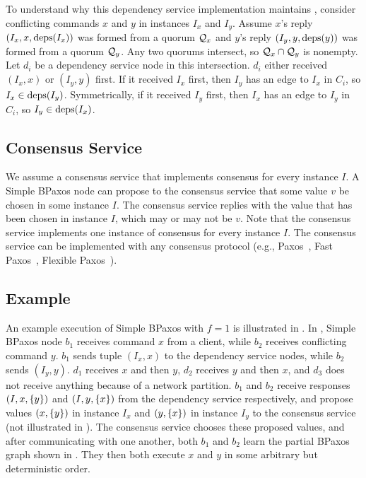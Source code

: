 To understand why this dependency service implementation maintains
, consider conflicting commands $x$ and $y$ in
instances $I_x$ and $I_y$. Assume $x$'s reply $(I_x, x, \text{deps}(I_x))$ was formed
from a quorum $\mathcal{Q}_x$ and $y$'s reply $(I_y, y, \text{deps}(y))$ was formed from
a quorum $\mathcal{Q}_y$. Any two quorums intersect, so $\mathcal{Q}_x \cap \mathcal{Q}_y$
is nonempty. Let $d_i$ be a dependency service node in this intersection. $d_i$
either received $(I_x, x)$ or $(I_y, y)$ first. If it received $I_x$ first,
then $I_y$ has an edge to $I_x$ in $C_i$, so $I_x \in \text{deps}(I_y)$.
Symmetrically, if it received $I_y$ first, then $I_x$ has an edge to $I_y$ in
$C_i$, so $I_y \in \text{deps}(I_x)$.

\subsection{Consensus Service}
We assume a consensus service that implements consensus for every instance $I$.
A Simple BPaxos node can propose to the consensus service that some value $v$
be chosen in some instance $I$. The consensus service replies with the value
that has been chosen in instance $I$, which may or may not be $v$. Note that
the consensus service implements one instance of consensus for every instance
$I$. The consensus service can be implemented with any consensus protocol
(e.g., Paxos~\cite{lamport1998part, lamport2001paxos}, Fast
Paxos~\cite{lamport2006fast}, Flexible Paxos~\cite{howard2016flexible}).

\subsection{Example}


An example execution of Simple BPaxos with $f=1$ is illustrated in
. In , Simple BPaxos
node $b_1$ receives command $x$ from a client, while $b_2$ receives conflicting
command $y$. $b_1$ sends tuple $(I_x, x)$ to the dependency service nodes,
while $b_2$ sends $(I_y, y)$. $d_1$ receives $x$ and then $y$, $d_2$ receives
$y$ and then $x$, and $d_3$ does not receive anything because of a network
partition. $b_1$ and $b_2$ receive responses $(I, x, \{y\})$ and $(I, y,
\{x\})$ from the dependency service respectively, and propose values $(x,
\{y\})$ in instance $I_x$ and $(y, \{x\})$ in instance $I_y$ to the
consensus service (not illustrated in ). The
consensus service chooses these proposed values, and after communicating with
one another, both $b_1$ and $b_2$ learn the partial BPaxos graph shown in
.  They then both execute $x$ and $y$ in some
arbitrary but deterministic order.

